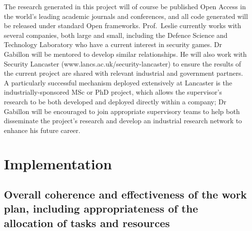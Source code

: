 \documentclass[a4paper,11pt]{article}
\newcommand{\TODO}[1]{{\textcolor{red}{[\textbf{TODO:} #1]}}}
\begin{document}
The research generated in this project will of course be published Open Access in the world's leading academic journals and conferences, and all code generated will be released under standard Open frameworks.  Prof.\ Leslie currently works with several companies, both large and small, including the Defence Science and Technology Laboratory who have a current interest in security games. Dr Gabillon will be mentored to develop similar relationships.  He will also work with Security Lancaster (www.lancs.ac.uk/security-lancaster) to ensure the results of the current project are shared with relevant industrial and government partners. 
A particularly successful mechanism deployed extensively at Lancaster is the industrially-sponsored MSc or PhD project, which allows the supervisor's research to be both developed and deployed directly within a company; Dr Gabillon will be encouraged to join appropriate supervisory teams to help both disseminate the project's research and develop an industrial research network to enhance his future career.

\section{Implementation}
\label{sec:implementation}


\subsection{Overall coherence and effectiveness of the work plan, including appropriateness of the allocation of tasks and resources}
\end{document}
